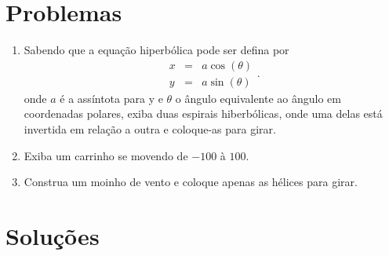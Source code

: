 



\section*{Problemas}
\begin{enumerate}
\item
  Sabendo que a equação hiperbólica pode ser defina por
  $$
  \begin{matrix}
  x	& = &	a \cos(\theta) \\ 
  y	& = &	a \sin(\theta)
  \end{matrix}.
  $$
  onde $a$ é a assíntota para y e $\theta$ o ângulo equivalente ao ângulo em coordenadas polares, exiba duas espirais hiberbólicas, onde uma delas está invertida em relação a outra e coloque-as para girar.
  \label{ex:cap01_ex5}

\item
  Exiba um carrinho se movendo de $-100$ à $100$.
  \label{ex:cap01_ex6}

\item
  Construa um moinho de vento e coloque apenas as hélices para girar.
  \label{ex:cap01_ex7}
\end{enumerate}

\section*{Soluções}

